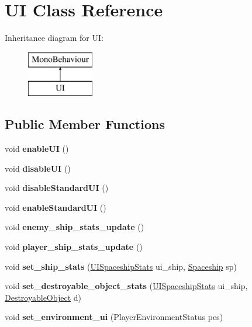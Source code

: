 \hypertarget{class_u_i}{}\section{UI Class Reference}
\label{class_u_i}
Inheritance diagram for UI\+:\begin{figure}[H]
\begin{center}
\leavevmode
\includegraphics[height=2.000000cm]{class_u_i}
\end{center}
\end{figure}
\subsection*{Public Member Functions}
\begin{DoxyCompactItemize}
\item 
\mbox{\label{class_u_i_a5cd0dd42a3b1e2bdffeb086cd36b7c67}} 
void {\bfseries enable\+UI} ()
\item 
\mbox{\label{class_u_i_a5ea2375940770e9a2c570a53255790c7}} 
void {\bfseries disable\+UI} ()
\item 
\mbox{\label{class_u_i_a73daf9c31a2f5f2e6802686979459df8}} 
void {\bfseries disable\+Standard\+UI} ()
\item 
\mbox{\label{class_u_i_a97da47b02c5ab9292715651b0fccf881}} 
void {\bfseries enable\+Standard\+UI} ()
\item 
\mbox{\label{class_u_i_a03e2001bc49baa9fca0093499ad18b4a}} 
void {\bfseries enemy\+\_\+ship\+\_\+stats\+\_\+update} ()
\item 
\mbox{\label{class_u_i_a3bd8b8b18af8269b8226805d474749cd}} 
void {\bfseries player\+\_\+ship\+\_\+stats\+\_\+update} ()
\item 
\mbox{\label{class_u_i_a77e015836080677a0a8f2e17e77629b0}} 
void {\bfseries set\+\_\+ship\+\_\+stats} (\hyperlink{struct_u_i_spaceship_stats}{U\+I\+Spaceship\+Stats} ui\+\_\+ship, \hyperlink{class_spaceship}{Spaceship} sp)
\item 
\mbox{\label{class_u_i_a7c08dcb5e750df57e1321e73892e167b}} 
void {\bfseries set\+\_\+destroyable\+\_\+object\+\_\+stats} (\hyperlink{struct_u_i_spaceship_stats}{U\+I\+Spaceship\+Stats} ui\+\_\+ship, \hyperlink{class_destroyable_object}{Destroyable\+Object} d)
\item 
\mbox{\label{class_u_i_a8abb7625bc4df95dbbeaa22fe1645740}} 
void {\bfseries set\+\_\+environment\+\_\+ui} (Player\+Environment\+Status pes)
\end{DoxyCompactItemize}
